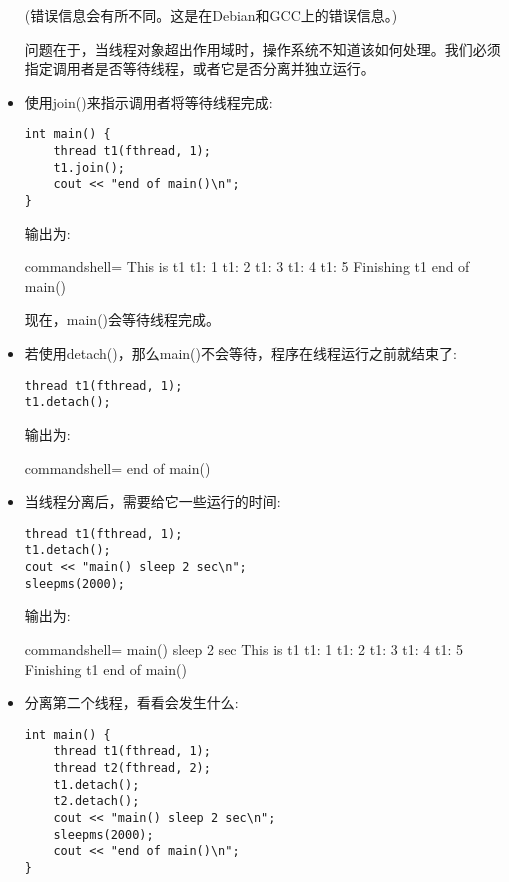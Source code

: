 \begin{itemize}
(错误信息会有所不同。这是在Debian和GCC上的错误信息。)

问题在于，当线程对象超出作用域时，操作系统不知道该如何处理。我们必须指定调用者是否等待线程，或者它是否分离并独立运行。

\item 
使用join()来指示调用者将等待线程完成:

\begin{lstlisting}[style=styleCXX]
int main() {
	thread t1(fthread, 1);
	t1.join();
	cout << "end of main()\n";
}
\end{lstlisting}

输出为:

\begin{tcblisting}{commandshell={}}
This is t1
t1: 1
t1: 2
t1: 3
t1: 4
t1: 5
Finishing t1
end of main()
\end{tcblisting}

现在，main()会等待线程完成。

\item 
若使用detach()，那么main()不会等待，程序在线程运行之前就结束了:

\begin{lstlisting}[style=styleCXX]
thread t1(fthread, 1);
t1.detach();
\end{lstlisting}

输出为:

\begin{tcblisting}{commandshell={}}
end of main()
\end{tcblisting}

\item 
当线程分离后，需要给它一些运行的时间:

\begin{lstlisting}[style=styleCXX]
thread t1(fthread, 1);
t1.detach();
cout << "main() sleep 2 sec\n";
sleepms(2000);
\end{lstlisting}

输出为:

\begin{tcblisting}{commandshell={}}
main() sleep 2 sec
This is t1
t1: 1
t1: 2
t1: 3
t1: 4
t1: 5
Finishing t1
end of main()
\end{tcblisting}

\item 
分离第二个线程，看看会发生什么:

\begin{lstlisting}[style=styleCXX]
int main() {
	thread t1(fthread, 1);
	thread t2(fthread, 2);
	t1.detach();
	t2.detach();
	cout << "main() sleep 2 sec\n";
	sleepms(2000);
	cout << "end of main()\n";
}
\end{lstlisting}


\end{itemize}
